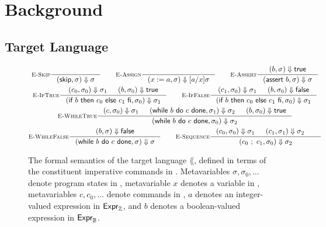 \documentclass[p.tex]{subfiles}
\begin{document}
\section{Background}\label{sec:background}

\subsection{Target Language}\label{sec:language}

\begin{figure}
\begin{spreadlines}{5pt}
  \begin{gather*}
    \inference[\textsc{E-Skip}]{%
    }{%
      \ceval{\cskip}{\sigma}{\sigma}
    }
    \qquad
    \inference[\textsc{E-Assign}]{%
    }{%
      \ceval{\cassign{x}{a}}{\sigma}{\subst{x}{a}{\sigma}}
    }
    \qquad
    \inference[\textsc{E-Assert}]{%
      \eeval{b}{\sigma}{\btrue}
    }{%
      \ceval{\cassert{b}}{\sigma}{\sigma}
    }
    \\
    \inference[\textsc{E-IfTrue}]{%
      \ceval{c_0}{\sigma_0}{\sigma_1}&
      \eeval{b}{\sigma_0}{\btrue}
    }{%
      \ceval{\cif{b}{c_0}{c_1}}{\sigma_0}{\sigma_1}
    }
    \qquad
    \inference[\textsc{E-IfFalse}]{%
      \ceval{c_1}{\sigma_0}{\sigma_1}&
      \eeval{b}{\sigma_0}{\bfalse}
    }{%
      \ceval{\cif{b}{c_0}{c_1}}{\sigma_0}{\sigma_1}
    }
    \\
    \inference[\textsc{E-WhileTrue}]{%
      \ceval{c}{\sigma_0}{\sigma_1}&
      \ceval{\cwhile{b}{c}}{\sigma_1}{\sigma_2}&
      \eeval{b}{\sigma_0}{\btrue}
    }{%
      \ceval{\cwhile{b}{c}}{\sigma_0}{\sigma_2}
    }
    \\
    \inference[\textsc{E-WhileFalse}]{%
      \eeval{b}{\sigma}{\bfalse}
    }{%
      \ceval{\cwhile{b}{c}}{\sigma}{\sigma}
    }
    \qquad
    \inference[\textsc{E-Sequence}]{%
      \ceval{c_0}{\sigma_0}{\sigma_1}&
      \ceval{c_1}{\sigma_1}{\sigma_2}&
    }{%
      \ceval{\cseq{c_0}{c_1}}{\sigma_0}{\sigma_2}
    }
  \end{gather*}
  \end{spreadlines}
  \caption{%
    The formal semantics of the target language $\lang$, defined in
    terms of the constituent imperative commands in \com.
    Metavariables $\sigma, \sigma_0, \ldots$ denote program states in
    \state, metavariable $x$ denotes a variable in \var, metavariables
    $c, c_0, \ldots$ denote commands in \com, $a$ denotes an
    integer-valued expression in $\textsf{Expr}_{\mathbb{Z}}$, and $b$ denotes a
    boolean-valued expression in $\textsf{Expr}_{\mathbb{B}}$.
  }\label{fig:semantics}
\end{figure}
\end{document}
